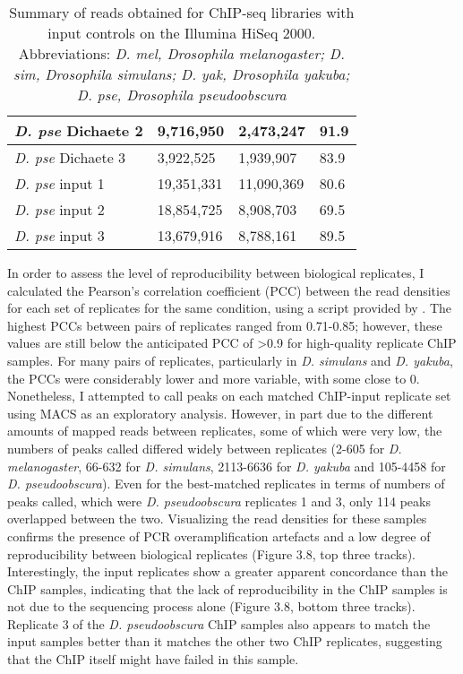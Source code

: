 \begin{table}[h]
\begin{tabular}{|l|l|l|l|}
\emph{D. pse} Dichaete 2 & 9,716,950   & 2,473,247    & 91.9               \\ \hline
\emph{D. pse} Dichaete 3 & 3,922,525   & 1,939,907    & 83.9               \\ \hline
\emph{D. pse} input 1    & 19,351,331  & 11,090,369   & 80.6               \\ \hline
\emph{D. pse} input 2    & 18,854,725  & 8,908,703    & 69.5               \\ \hline
\emph{D. pse} input 3    & 13,679,916  & 8,788,161    & 89.5               \\ \hline
\end{tabular}
\caption{Summary of reads obtained for ChIP-seq libraries with input controls on the Illumina HiSeq 2000. Abbreviations: \emph{D. mel, Drosophila melanogaster; D. sim, Drosophila simulans; D. yak, Drosophila yakuba; D. pse, Drosophila pseudoobscura}}
\label{Table 3.3}
\end{table}

In order to assess the level of reproducibility between biological replicates, I calculated the Pearson's correlation coefficient (PCC) between the read densities for each set of replicates for the same condition, using a script provided by \citet{bardet_computational_2011}. The highest PCCs between pairs of replicates ranged from 0.71-0.85; however, these values are still below the anticipated PCC of \textgreater 0.9 for high-quality replicate ChIP samples. For many pairs of replicates, particularly in \emph{D. simulans} and \emph{D. yakuba}, the PCCs were considerably lower and more variable, with some close to 0. Nonetheless, I attempted to call peaks on each matched ChIP-input replicate set using MACS as an exploratory analysis. However, in part due to the different amounts of mapped reads between replicates, some of which were very low, the numbers of peaks called differed widely between replicates (2-605 for \emph{D. melanogaster}, 66-632 for \emph{D. simulans}, 2113-6636 for \emph{D. yakuba} and 105-4458 for \emph{D. pseudoobscura}). Even for the best-matched replicates in terms of numbers of peaks called, which were \emph{D. pseudoobscura} replicates 1 and 3, only 114 peaks overlapped between the two. Visualizing the read densities for these samples confirms the presence of PCR overamplification artefacts and a low degree of reproducibility between biological replicates (Figure 3.8, top three tracks). Interestingly, the input replicates show a greater apparent concordance than the ChIP samples, indicating that the lack of reproducibility in the ChIP samples is not due to the sequencing process alone (Figure 3.8, bottom three tracks). Replicate 3 of the \emph{D. pseudoobscura} ChIP samples also appears to match the input samples better than it matches the other two ChIP replicates, suggesting that the ChIP itself might have failed in this sample.

